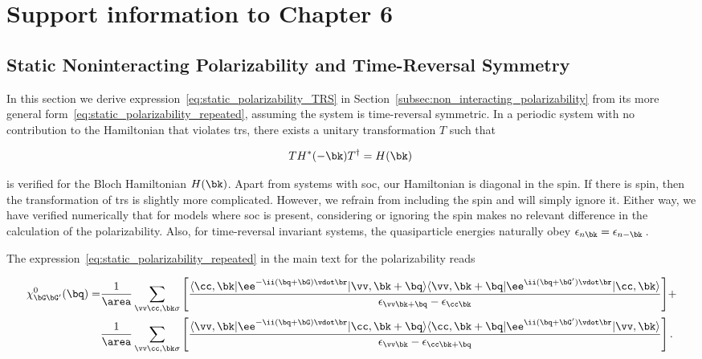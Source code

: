 
%


\chapter{Support information to Chapter 6}
\label{app:screening}

\section{Static Noninteracting Polarizability and Time-Reversal Symmetry}
\label{app:polarizability_TRS_proof}

In this section we derive expression~\eqref{eq:static_polarizability_TRS} in Section~\ref{subsec:non_interacting_polarizability} from its more general form~\eqref{eq:static_polarizability_repeated}, assuming the system is time-reversal symmetric.
In a periodic system with no contribution to the Hamiltonian that violates \gls{trs}, there exists a unitary transformation $T$ such that

\begin{equation}
    T H^*(-\bk) T^{\dagger} = H(\bk) \,
\end{equation}

\noindent is verified for the Bloch Hamiltonian $H(\bk)$.
Apart from systems with \gls{soc}, our Hamiltonian is diagonal in the spin.
If there is spin, then the transformation of \gls{trs} is slightly more complicated.
However, we refrain from including the spin and will simply ignore it.
Either way, we have verified numerically that for models where \gls{soc} is present, considering or ignoring the spin makes no relevant difference in the calculation of the polarizability.
Also, for time-reversal invariant systems, the quasiparticle energies naturally obey $\epsilon_{n  \bk} = \epsilon_{n - \bk}$\,.

The expression~\eqref{eq:static_polarizability_repeated} in the main text for the polarizability reads

\begin{equation}
\begin{aligned}
     \chi^0_{\bG\bG'}(\bq) = & \frac{1}{\area} \sum_{\vv \cc,\bk \sigma} \Bigg[\frac{\langle \cc,\bk|\ee^{-\ii(\bq+\bG)\vdot\br}|\vv,\bk+\bq\rangle \langle \vv,\bk+\bq|\ee^{\ii(\bq+\bG')\vdot\br}|\cc,\bk\rangle}{\epsilon_{\vv \bk+\bq} - \epsilon_{\cc \bk}} \Bigg] + \\
                             & \frac{1}{\area} \sum_{\vv \cc,\bk \sigma} \Bigg[\frac{\langle \vv,\bk|\ee^{-\ii(\bq+\bG)\vdot\br}|\cc,\bk+\bq\rangle \langle \cc,\bk+\bq|\ee^{\ii(\bq+\bG')\vdot\br}|\vv,\bk\rangle}{\epsilon_{\vv \bk} - \epsilon_{\cc \bk+\bq}}\Bigg] \,.
\end{aligned}
\end{equation}

